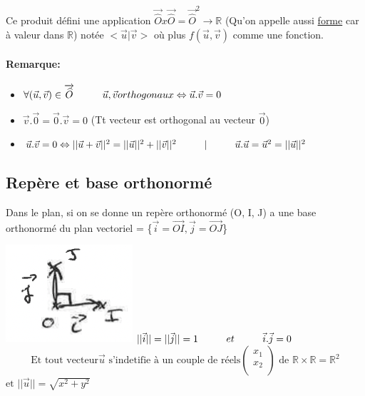 \documentclass{article}
\newcommand\tab[1][1cm]{\hspace*{#1}}
\begin{document}
Ce produit défini une application $\overrightarrow{\widehat{O}} x \overrightarrow{\widehat{O}} = \overrightarrow{\widehat{O}}^2 \rightarrow \mathbb{R}$
(Qu'on appelle aussi \underline{forme} car à valeur dans $\mathbb{R}$)
notée $<\vec{u}|\vec{v}>$ où plus $f(\vec{u}, \vec{v})$ comme une fonction.

\paragraph{Remarque:}

\begin{itemize}
    \item $\forall (\vec{u}, \vec{v}) \in \overrightarrow{\widehat{O}} \tab \vec{u}, \vec{v} orthogonaux \Leftrightarrow \vec{u} . \vec{v} = 0$
    \item $\vec{v} . \vec{0} = \vec{0} . \vec{v} = 0$ (Tt vecteur est orthogonal au vecteur $\vec{0}$)
    \item $\vec{u} . \vec{v} = 0 \Leftrightarrow ||\vec{u} + \vec{v}||^2 = ||\vec{u}||^2 + ||\vec{v}||^2 \tab | \tab \vec{u} . \vec{u} = \vec{u}^2 = ||\vec{u}||^2$
\end{itemize}

\subsection{Repère et base orthonormé}

Dans le plan, si on se donne un repère orthonormé (O, I, J) a une base orthonormé du plan vectoriel = \{$\vec{i} = \overrightarrow{OI}, \vec{j} = \overrightarrow{OJ}$\}

\includegraphics{images/image05.png} $||\vec{i}|| = ||\vec{j}|| = 1 \tab et \tab \vec{i} . \vec{j} = 0$
$$
\mbox{Et tout vecteur} \vec{u} \mbox{ s'indetifie à un couple de réels}
\left( 
    \begin{array}{c}
    x_1 \\
    x_2 \\
    \end{array}
\right)
\mbox{ de } \mathbb{R} \times \mathbb{R} = \mathbb{R}^2
$$
$\mbox{et } ||\vec{u}|| = \sqrt{x^2 + y^2}$
\end{document}
